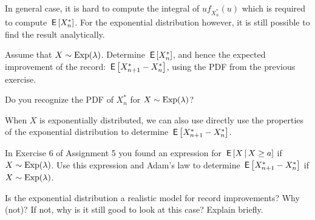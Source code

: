 \documentclass[assignments]{subfiles}
\begin{document}
In general case, it is hard to compute the integral of $u f_{X_n^*}(u)$ which is required to compute $\,\mathsf{E}\left[X_n^*\right]$.
For the exponential distribution however, it is still possible to find the result analytically.

\begin{exercise}
Assume that $X \sim \mathrm{Exp}(\lambda)$. Determine $\,\mathsf{E}\left[X_n^*\right]$, and hence the expected improvement of the record: $\,\mathsf{E}\left[X_{n+1}^* - X_n^*\right]$, using the PDF from the previous exercise.
\begin{hint}
Do you recognize the PDF of $X_n^*$ for $X \sim \mathrm{Exp}(\lambda)$?
\end{hint}


\end{exercise}


When $X$ is exponentially distributed, we can also use directly use the properties of the exponential distribution to determine  $\,\mathsf{E}\left[X_{n+1}^* - X_n^*\right]$.

\begin{exercise}
In Exercise 6 of Assignment 5 you found an expression for $\,\mathsf{E}\left[X \,\middle|\, X \geq a\right]$ if $X \sim \mathrm{Exp}(\lambda)$. Use this expression and Adam's law to determine  $\,\mathsf{E}\left[X_{n+1}^* - X_n^*\right]$  if $X \sim \mathrm{Exp}(\lambda)$.

\end{exercise}

\begin{exercise}
Is the exponential distribution a realistic model for record improvements? Why (not)? If not, why is it still good to look at this case? Explain briefly.


\end{exercise}
\end{document}
